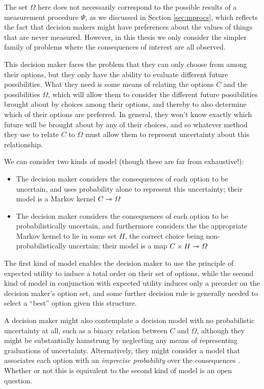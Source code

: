 The set $\Omega$ here does not necessarily correspond to the possible results of a measurement procedure $\Psi$, as we discussed in Section \ref{sec:mprocs}, which reflects the fact that decision makers might have preferences about the values of things that are never measured. However, in this thesis we only consider the simpler family of problems where the consequences of interest are all observed.

This decision maker faces the problem that they can only choose from among their options, but they only have the ability to evaluate different future possibilities. What they need is some means of relating the options $C$ and the possibilities $\Omega$, which will allow them to consider the different future possibilities brought about by choices among their options, and thereby to also determine which of their options are preferred. In general, they won't know exactly which future will be brought about by any of their choices, and so whatever method they use to relate $C$ to $\Omega$ must allow them to represent uncertainty about this relationship. 

We can consider two kinds of model (though these are far from exhaustive!):
\begin{itemize}
    \item The decision maker considers the consequences of each option to be uncertain, and uses probability alone to represent this uncertainty; their model is a Markov kernel $C\rightarrowtriangle \Omega$
    \item The decision maker considers the consequences of each option to be probabilistically uncertain, and furthermore considers the the appropriate Markov kernel to lie in some set $H$, the correct choice being non-probabilistically uncertain; their model is a map $C\times H\rightarrowtriangle \Omega$
\end{itemize}
The first kind of model enables the decision maker to use the principle of expected utility to induce a total order on their set of options, while the second kind of model in conjunction with expected utility induces only a preorder on the decision maker's option set, and some further decision rule is generally needed to select a ``best'' option given this structure.

A decision maker might also contemplate a decision model with no probabilistic uncertainty at all, such as a binary relation between $C$ and $\Omega$, although they might be substantially hamstrung by neglecting any means of representing graduations of uncertainty. Alternatively, they might consider a model that associates each option with an \emph{imprecise probability} over the consequences \citep{walley_statistical_1991}. Whether or not this is equivalent to the second kind of model is an open question.

